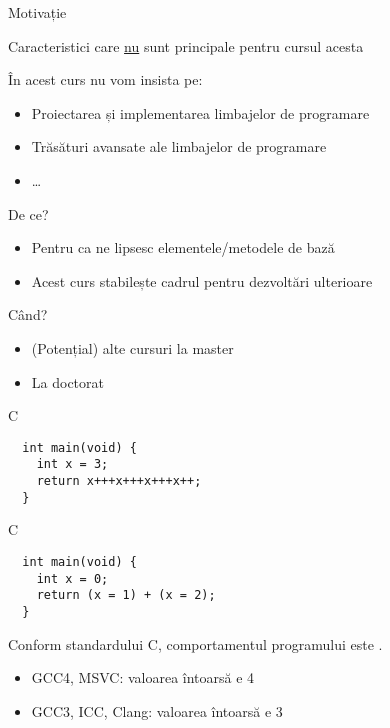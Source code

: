 \documentclass[xcolor=pdftex,romanian,colorlinks]{beamer}
\begin{document}
\begin{section}{Motivație}
\begin{frame}{Caracteristici care \underline{nu} sunt principale pentru cursul acesta}
\begin{block}{În acest curs \alert{nu} vom insista pe:}
\begin{itemize}
\item Proiectarea și implementarea limbajelor de programare
\item Trăsături avansate ale limbajelor de programare
\item \ldots
\end{itemize}
\end{block}

\begin{block}{De ce?}
\begin{itemize}
\item Pentru ca ne lipsesc elementele/metodele de bază
\item Acest curs stabilește cadrul pentru dezvoltări ulterioare
\end{itemize}
\end{block}

\begin{block}{Când?}
\begin{itemize}
\item (Potențial) alte cursuri la master
\item La doctorat 
\end{itemize}
\end{block}
\end{frame}

\begin{frame}[fragile]{C}
\begin{block}{}
\begin{verbatim}
  int main(void) {
    int x = 3;
    return x+++x+++x+++x++;
  }
\end{verbatim}
\end{block}
\end{frame}

\begin{frame}[fragile]{C}

\begin{block}{}
\begin{verbatim}
  int main(void) {
    int x = 0;
    return (x = 1) + (x = 2);
  }
\end{verbatim}
\end{block}
Conform standardului C, comportamentul programului este .
\begin{itemize}
\item GCC4, MSVC: valoarea întoarsă e \alert{4}
\item GCC3, ICC, Clang: valoarea întoarsă e \alert{3}
\end{itemize}
\end{frame}


\end{section}
\end{document}

